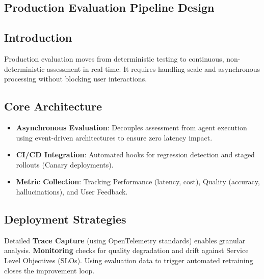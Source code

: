 
\begin{TNtwocol}
\section{Production Evaluation Pipeline Design }
\subsection{Introduction}
Production evaluation moves from deterministic testing to continuous, non-deterministic assessment in real-time. It requires handling scale and asynchronous processing without blocking user interactions.

\subsection{Core Architecture}
\begin{itemize}
    \item \textbf{Asynchronous Evaluation}: Decouples assessment from agent execution using event-driven architectures to ensure zero latency impact.
    \item \textbf{CI/CD Integration}: Automated hooks for regression detection and staged rollouts (Canary deployments).
    \item \textbf{Metric Collection}: Tracking Performance (latency, cost), Quality (accuracy, hallucinations), and User Feedback.
\end{itemize}

\end{TNtwocol}
\begin{TNtwocol}
\subsection{Deployment Strategies}
Detailed \textbf{Trace Capture} (using OpenTelemetry standards) enables granular analysis. \textbf{Monitoring} checks for quality degradation and drift against Service Level Objectives (SLOs). Using evaluation data to trigger automated retraining closes the improvement loop.
\end{TNtwocol}
